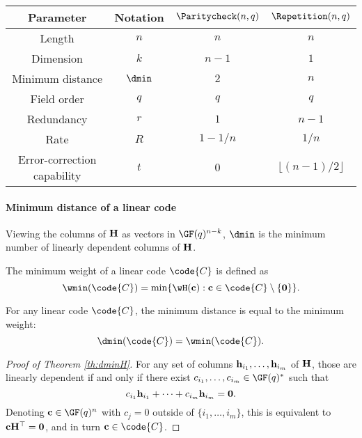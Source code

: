 \documentclass[a4paper, 11pt, openany]{book}
\begin{document}
\begin{tabular}{|c|c|c|c|}
	\hline
	Parameter & Notation & $\Paritycheck(n,q)$ & $\Repetition(n,q)$\\
	\hline
	Length                      & $n$       & $n$       & $n$\\
	Dimension                   & $k$       & $n-1$     & $1$\\
	Minimum distance            & $\dmin$   & $2$       & $n$\\
	Field order                 & $q$       & $q$       & $q$\\
	Redundancy                  & $r$       & $1$       & $n-1$\\
	Rate                        & $R$       & $1 - 1/n$ & $1/n$\\
	Error-correction capability & $t$       & $0$       & $\lfloor (n-1)/2 \rfloor$\\
	\hline
\end{tabular}



\paragraph{Minimum distance of a linear code}


\begin{theorem} \label{th:dminH}
Viewing the columns of ${\bf H}$ as vectors in $\GF(q)^{n-k}$, $\dmin$ is the minimum number of linearly dependent columns of ${\bf H}$.
\end{theorem}

The minimum weight of a linear code $\code{C}$ is defined as
\[
	\wmin(\code{C}) = \min \{ \wH({\bf c}) : {\bf c} \in \code{C} \setminus \{ {\bf 0} \} \}.
\]

\begin{lemma} \label{lemma:dminwmin}
 For any linear code $\code{C}$, the minimum distance is equal to the minimum weight:
\[
	\dmin(\code{C}) = \wmin(\code{C}).
\]
\end{lemma}

\begin{proof}[Proof of Theorem \ref{th:dminH}]
For any set of columns ${\bf h}_{i_1}, \dots, {\bf h}_{i_m}$ of ${\bf H}$, those are linearly dependent if and only if there exist $c_{i_1}, \dots, c_{i_m} \in \GF(q)^*$ such that
\[
	c_{i_1} {\bf h}_{i_1} + \dots + c_{i_m} {\bf h}_{i_m} = {\bf 0}.
\]
Denoting ${\bf c} \in \GF(q)^n$ with $c_j = 0$ outside of $\{i_1, \dots, i_m\}$, this is equivalent to ${\bf c}{\bf H}^\top = {\bf 0}$, and in turn ${\bf c} \in \code{C}$.
\end{proof}
\end{document}
